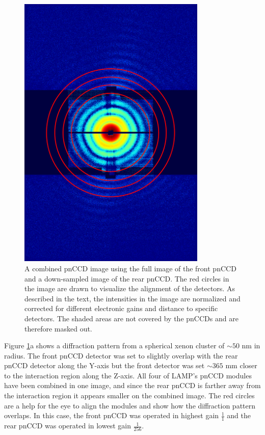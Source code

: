 \begin{figure}
	\centering
		\includegraphics[width=0.8\textwidth]{images/pnCCD-image-geometry.png}
	\caption[Front and rear pnCCD arranged to combine measured diffraction image.]{A combined pnCCD image using the full image of the front pnCCD and a down-sampled image of the rear pnCCD. The red circles in the image are drawn to visualize the alignment of the detectors. As described in the text, the intensities in the image are normalized and corrected for different electronic gains and distance to specific detectors. The shaded areas are not covered by the pnCCDs and are therefore masked out.}
	\label{fig:pnCCD-image-aligned}
\end{figure}
Figure \ref{fig:pnCCD-image-aligned}a shows a diffraction pattern from a spherical xenon cluster of $\sim 50$ nm in radius. The front pnCCD detector was set to slightly overlap with the rear pnCCD detector along the Y-axis but the front detector was set $\sim 365$ mm closer to the interaction region along the Z-axis. All four of LAMP's pnCCD modules have been combined in one image, and since the rear pnCCD is farther away from the interaction region it appears smaller on the combined image. The red circles are a help for the eye to align the modules and show how the diffraction pattern overlaps. In this case, the front pnCCD was operated in highest gain $\frac{1}{1}$ and the rear pnCCD was operated in lowest gain $\frac{1}{256}$.\\
